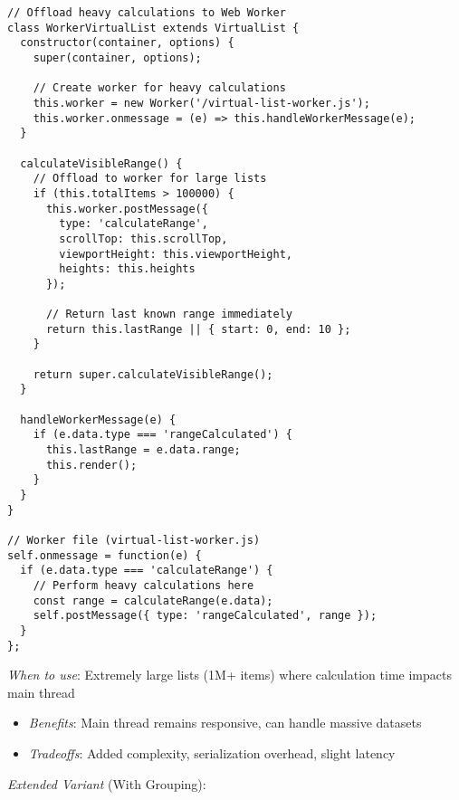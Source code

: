 \documentclass[11pt]{article}
\begin{document}
\begin{verbatim}
// Offload heavy calculations to Web Worker
class WorkerVirtualList extends VirtualList {
  constructor(container, options) {
    super(container, options);
    
    // Create worker for heavy calculations
    this.worker = new Worker('/virtual-list-worker.js');
    this.worker.onmessage = (e) => this.handleWorkerMessage(e);
  }
  
  calculateVisibleRange() {
    // Offload to worker for large lists
    if (this.totalItems > 100000) {
      this.worker.postMessage({
        type: 'calculateRange',
        scrollTop: this.scrollTop,
        viewportHeight: this.viewportHeight,
        heights: this.heights
      });
      
      // Return last known range immediately
      return this.lastRange || { start: 0, end: 10 };
    }
    
    return super.calculateVisibleRange();
  }
  
  handleWorkerMessage(e) {
    if (e.data.type === 'rangeCalculated') {
      this.lastRange = e.data.range;
      this.render();
    }
  }
}

// Worker file (virtual-list-worker.js)
self.onmessage = function(e) {
  if (e.data.type === 'calculateRange') {
    // Perform heavy calculations here
    const range = calculateRange(e.data);
    self.postMessage({ type: 'rangeCalculated', range });
  }
};
\end{verbatim}

\emph{When to use}: Extremely large lists (1M+ items) where calculation time impacts main thread
\begin{itemize}
\item \emph{Benefits}: Main thread remains responsive, can handle massive datasets
\item \emph{Tradeoffs}: Added complexity, serialization overhead, slight latency
\end{itemize}

\emph{Extended Variant} (With Grouping):
\end{document}
